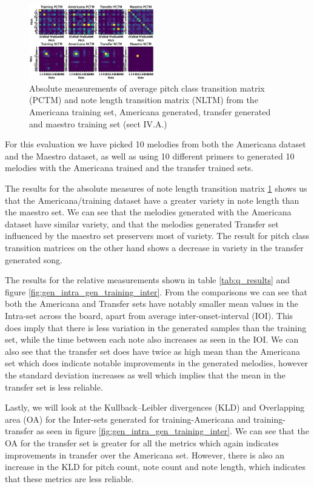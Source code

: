 \documentclass{IEEEtran}
\begin{document}
\begin{figure}
    \centering
    \includegraphics[width=0.485\textwidth]{PCTMNLTM.eps}
    \caption{
        Absolute measurements of average pitch class transition matrix
        (PCTM) and note length transition matrix (NLTM) from the Americana
        training set, Americana generated, transfer generated and maestro
        training set (sect IV.A.)
        \label{fig:absoluteNLTMPCTM}
    }
\end{figure}

For this evaluation we have picked 10 melodies from both the Americana
dataset and the Maestro dataset, as well as using 10 different primers to
generated 10 melodies with the Americana trained and the transfer trained
sets.

The results for the absolute measures of note length transition matrix
\ref{fig:absoluteNLTMPCTM} shows us that the Americana/training dataset have
a greater variety in note length than the maestro set. We can see that the
melodies generated with the Americana dataset have similar variety, and that
the melodies generated Transfer set influenced by the maestro set preservers
most of variety. The result for pitch class transition matrices on the other
hand shows a decrease in variety in the transfer generated song.

The results for the relative measurements shown in table \ref{tab:q_results}
and figure \ref{fig:gen_intra_gen_training_inter}. From the comparisons we
can see that both the Americana and Transfer sets have notably smaller mean
values in the Intra-set across the board, apart from average
inter-onset-interval (IOI). This does imply that there is less variation in
the generated samples than the training set, while the time between each note
also increases as seen in the IOI. We can also see that the transfer set does
have twice as high mean than the Americana set which does indicate notable
improvements in the generated melodies, however the standard deviation
increases as well which implies that the mean in the transfer set is less
reliable.

Lastly, we will look at the Kullback–Leibler divergences (KLD) and
Overlapping area (OA) for the Inter-sets generated for training-Americana and
training-transfer as seen in figure \ref{fig:gen_intra_gen_training_inter}.
We can see that the OA for the transfer set is greater for all the metrics
which again indicates improvements in transfer over the Americana set.
However, there is also an increase in the KLD for pitch count, note count and
note length, which indicates that these metrics are less reliable.
\end{document}
